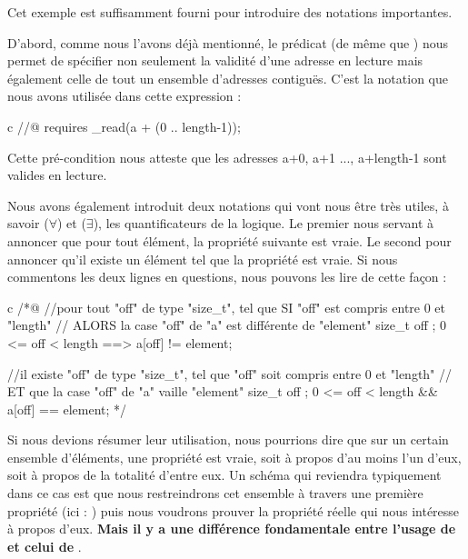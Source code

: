 \documentclass[middle]{zmdocument}
\begin{document}
Cet exemple est suffisamment fourni pour introduire des notations importantes.



D'abord, comme nous l'avons déjà mentionné, le prédicat  (de 
même que ) nous permet de spécifier non seulement la validité d'une 
adresse en lecture mais également celle de tout un ensemble d'adresses 
contiguës. C'est la notation que nous avons utilisée dans cette expression :



\begin{CodeBlock}{c}
//@ requires \valid_read(a + (0 .. length-1));
\end{CodeBlock}



Cette pré-condition nous atteste que les adresses a+0, a+1 ..., a+length-1 sont
valides en lecture.



Nous avons également introduit deux notations qui vont nous être très utiles, à 
savoir  ($\forall$) et  ($\exists$), les 
quantificateurs de la logique. Le premier nous servant à annoncer que pour tout
élément, la propriété suivante est vraie. Le second pour annoncer qu'il existe
un élément tel que la propriété est vraie. Si nous commentons les deux lignes en 
questions, nous pouvons les lire de cette façon :



\begin{CodeBlock}{c}
/*@
//pour tout "off" de type "size_t", tel que SI "off" est compris entre 0 et "length"
//                                 ALORS la case "off" de "a" est différente de "element"
\forall size_t off ; 0 <= off < length ==> a[off] != element;

//il existe "off" de type "size_t", tel que "off" soit compris entre 0 et "length"
//                                 ET que la case "off" de "a" vaille "element"
\exists size_t off ; 0 <= off < length && a[off] == element;
*/
\end{CodeBlock}



Si nous devions résumer leur utilisation, nous pourrions dire que sur un certain
ensemble d'éléments, une propriété est vraie, soit à propos d'au moins l'un
d'eux, soit à propos de la totalité d'entre eux. Un schéma qui reviendra 
typiquement dans ce cas est que nous restreindrons cet ensemble à travers une
première propriété (ici : ) puis nous voudrons prouver la
propriété réelle qui nous intéresse à propos d'eux. \textbf{Mais il y a une 
différence fondamentale entre l'usage de  et celui de }.
\end{document}
